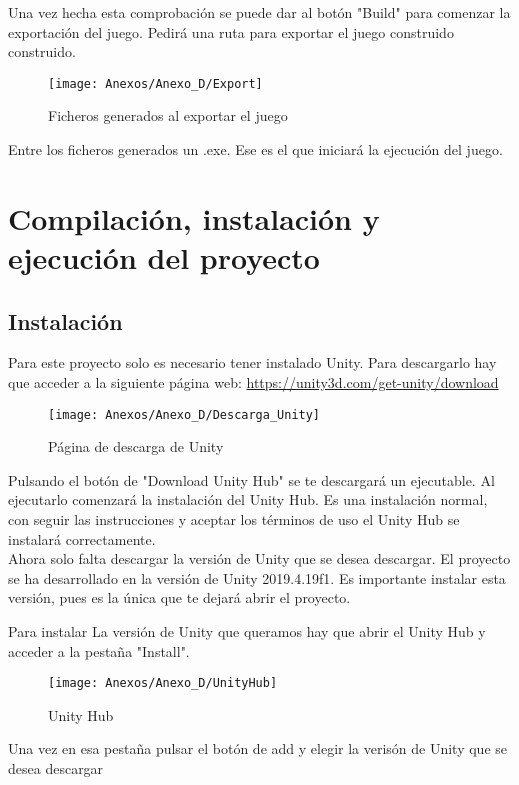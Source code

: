 Una vez hecha esta comprobación se puede dar al botón "Build" para comenzar la exportación del juego. Pedirá una ruta para exportar el juego construido construido.

\begin{figure}[h]
\centering
\texttt{[image: Anexos/Anexo\_D/Export]}
\caption{Ficheros generados al exportar el juego}
\end{figure}

Entre los ficheros generados un .exe. Ese es el que iniciará la ejecución del juego.

\section{Compilación, instalación y ejecución del proyecto}

\subsection{Instalación}
Para este proyecto solo es necesario tener instalado Unity. Para descargarlo hay que acceder a la siguiente página web: \url{https://unity3d.com/get-unity/download}

\begin{figure}[h]
\centering
\texttt{[image: Anexos/Anexo\_D/Descarga\_Unity]}
\caption{Página de descarga de Unity}
\end{figure}

Pulsando el botón de "Download Unity Hub" se te descargará un ejecutable. Al ejecutarlo comenzará la instalación del Unity Hub. Es una instalación normal, con seguir las instrucciones y aceptar los términos de uso el Unity Hub se instalará correctamente.\\
Ahora solo falta descargar la versión de Unity que se desea descargar. El proyecto se ha desarrollado en la versión de Unity 2019.4.19f1. Es importante instalar esta versión, pues es la única que te dejará abrir el proyecto.

Para instalar La versión de Unity que queramos hay que abrir el Unity Hub y acceder a la pestaña "Install".

\clearpage
\begin{figure}[h]
\centering
\texttt{[image: Anexos/Anexo\_D/UnityHub]}
\caption{Unity Hub}
\end{figure}

Una vez en esa pestaña pulsar el botón de add y elegir la verisón de Unity que se desea descargar


